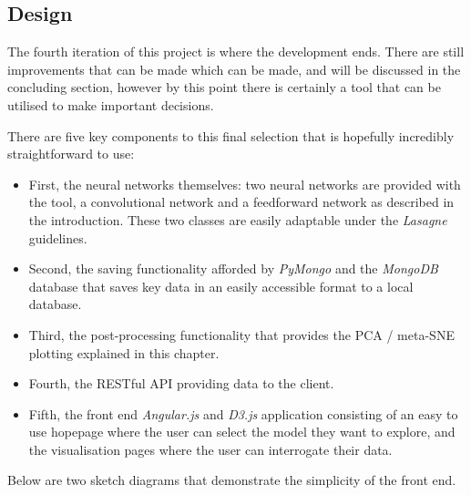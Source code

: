 \documentclass[a4paper,11pt,titlepage]{article}
\begin{document}
	\subsection{Design}
	The fourth iteration of this project is where the development ends. There are still improvements that can be made which can be made, and will be discussed in the concluding section, however by this point there is certainly a tool that can be utilised to make important decisions. 
	\par 
	There are five key components to this final selection that is hopefully incredibly straightforward to use:
	\begin{itemize}
		\item First, the neural networks themselves: two neural networks are provided with the tool, a convolutional network and a feedforward network as described in the introduction. These two classes are easily adaptable under the \textit{Lasagne} guidelines.
		\item Second, the saving functionality afforded by \textit{PyMongo} and the \textit{MongoDB} database that saves key data in an easily accessible format to a local database.
		\item Third, the post-processing functionality that provides the PCA / meta-SNE plotting explained in this chapter. 
		\item Fourth, the RESTful API providing data to the client.
		\item Fifth, the front end \textit{Angular.js} and \textit{D3.js} application consisting of an easy to use hopepage where the user can select the model they want to explore, and the visualisation pages where the user can interrogate their data.
	\end{itemize}
	
	Below are two sketch diagrams that demonstrate the simplicity of the front end.
	
		\begin{figure}[H]
    			\centering	
    			\qquad
    			\caption{}%
    			\label{fig:pca_varimax}
	\end{figure}
	
\end{document}
